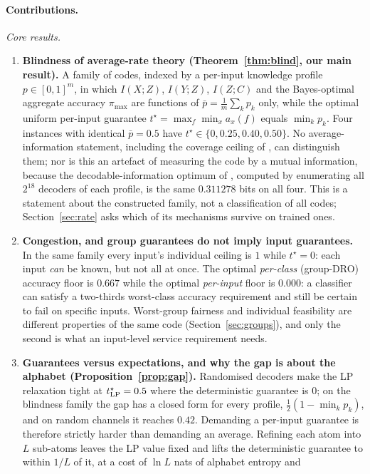 \documentclass[11pt]{article}
\begin{document}
\paragraph{Contributions.}
\emph{Core results.}
\begin{enumerate}
\item \textbf{Blindness of average-rate theory (Theorem~\ref{thm:blind}, our main result).}
A family of codes, indexed by a per-input knowledge profile $p\in[0,1]^m$, in which
$I(X;Z)$, $I(Y;Z)$, $I(Z;C)$ and the Bayes-optimal aggregate accuracy $\pi_{\max}$ are functions
of $\bar p=\frac1m\sum_k p_k$ only, while the optimal uniform per-input guarantee
$t^\star=\max_f\min_x a_x(f)$ equals $\min_k p_k$. Four instances with identical
$\bar p=0.5$ have $t^\star\in\{0,0.25,0.40,0.50\}$. No average-information statement, including
the coverage ceiling of \citet{knowing2026}, can distinguish them; nor is this an artefact of
measuring the code by a mutual information, because the decodable-information optimum of
\citet{dubois2020}, computed by enumerating all $2^{18}$ decoders of each profile, is the same
$0.311278$ bits on all four. This is a statement about the constructed family, not a
classification of all codes; Section~\ref{sec:rate} asks which of its mechanisms survive on
trained ones.
\item \textbf{Congestion, and group guarantees do not imply input guarantees.} In the same family
every input's individual ceiling is $1$ while $t^\star=0$: each input \emph{can} be known, but
not all at once. The optimal \emph{per-class} (group-DRO) accuracy floor is $0.667$ while the
optimal \emph{per-input} floor is $0.000$: a classifier can satisfy a two-thirds worst-class
accuracy requirement and still be certain to fail on specific inputs. Worst-group fairness and
individual feasibility are different properties of the same code
(Section~\ref{sec:groups}), and only the second is what an input-level service requirement needs.
\item \textbf{Guarantees versus expectations, and why the gap is about the alphabet
(Proposition~\ref{prop:gap}).} Randomised decoders make the LP relaxation tight at
$t^\star_{\rm LP}=0.5$ where the deterministic guarantee is $0$; on the blindness family the gap
has a closed form for every profile, $\tfrac12(1-\min_k p_k)$, and on random channels it
reaches $0.42$. Demanding a per-input guarantee is therefore strictly harder than demanding an
average. Refining each atom into $L$ sub-atoms leaves the LP value fixed and lifts the
deterministic guarantee to within $1/L$ of it, at a cost of $\ln L$ nats of alphabet entropy and

\end{enumerate}
\end{document}
